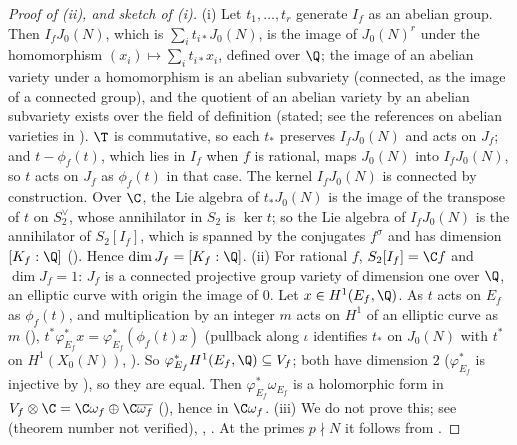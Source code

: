 \begin{proof}[Proof of (ii), and sketch of (i)]
(i) Let $t_1,\dots,t_r$ generate $I_f$ as an abelian group. Then $I_fJ_0(N)$, which is $\sum_it_{i*}J_0(N)$, is the image of $J_0(N)^r$ under the homomorphism $(x_i)\mapsto\sum_it_{i*}x_i$,
defined over $\Q$; the image of an abelian variety under a homomorphism is an abelian subvariety (connected, as the image of a connected group), and the quotient of an
abelian variety by an abelian subvariety exists over the field of definition (stated; see the references on abelian varieties in ). $\T$ is commutative, so each $t_*$ preserves
$I_fJ_0(N)$ and acts on $J_f$; and $t-\phi_f(t)$, which lies in $I_f$ when $f$ is rational, maps $J_0(N)$ into $I_fJ_0(N)$, so $t$ acts on $J_f$ as $\phi_f(t)$ in that case.
The kernel $I_fJ_0(N)$ is connected by construction. Over $\C$, the Lie algebra of $t_*J_0(N)$ is the image of the transpose of $t$ on $S_2^\vee$, whose annihilator in $S_2$ is
$\ker t$; so the Lie algebra of $I_fJ_0(N)$ is the annihilator of $S_2[I_f]$, which is spanned by the conjugates $f^\sigma$ and has dimension $[K_f:\Q]$ (). Hence
$\dim J_f=[K_f:\Q]$.
(ii) For rational $f$, $S_2[I_f]=\C f$ and $\dim J_f=1$: $J_f$ is a connected projective group variety of dimension one over $\Q$, an elliptic curve with origin the image of
$0$. Let $x\in H^1(E_f,\Q)$. As $t$ acts on $E_f$ as $\phi_f(t)$, and multiplication by an integer $m$ acts on $H^1$ of an elliptic curve as $m$ (),
$t^*\varphi_{E_f}^*x=\varphi_{E_f}^*(\phi_f(t)x)$ (pullback along $\iota$ identifies $t_*$ on $J_0(N)$ with $t^*$ on $H^1(X_0(N))$, ). So
$\varphi_{E_f}^*H^1(E_f,\Q)\subseteq V_f$; both have dimension $2$ ($\varphi_{E_f}^*$ is injective by ), so they are equal. Then $\varphi_{E_f}^*\omega_{E_f}$ is a
holomorphic form in $V_f\otimes\C=\C\omega_f\oplus\C\overline{\omega_f}$ (), hence in $\C\omega_f$.
(iii) We do not prove this; see \cite[Theorem 7.14 and Section 7.5]{Shimura71} (theorem number not verified), \cite{Shimura73}, \cite[Section 6.6]{DiamondShurman}. At the primes
$p\nmid N$ it follows from .
\end{proof}


